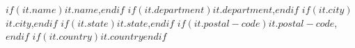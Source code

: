 $if(it.name)$$it.name$,$endif$ $if(it.department)$$it.department$,$endif$ $if(it.city)$$it.city$,$endif$ $if(it.state)$$it.state$,$endif$ $if(it.postal-code)$$it.postal-code$,$endif$ $if(it.country)$$it.country$$endif$